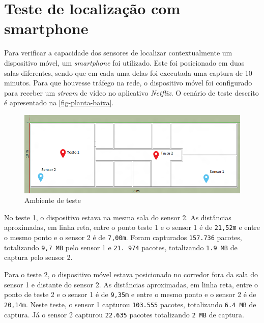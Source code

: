 \section{Teste de localização com smartphone}
\label{sec:teste-smarphone}

Para verificar a capacidade dos sensores de localizar contextualmente um
dispositivo móvel, um \emph{smartphone} foi utilizado. Este foi posicionado em duas salas
diferentes, sendo que em cada uma delas foi executada uma captura de 10 minutos. Para
que houvesse tráfego na rede, o dispositivo móvel foi configurado para receber um
\emph{stream} de vídeo no aplicativo \emph{Netflix}. O cenário de teste descrito é apresentado na \autoref{fig-planta-baixa}.

\begin{figure}[htb]
	\caption{\label{fig-planta-baixa}Ambiente de teste}
	\begin{center}
		\includegraphics[width=1\textwidth]{060-testes/data-analisis/planta-baixa-smartphone.png}
	\end{center}
\end{figure}


No teste 1, o dispositivo estava na mesma sala do sensor 2. As distâncias
aproximadas, em linha reta, entre o ponto teste 1 e o sensor 1 é de \texttt{21,52m} e
entre o mesmo ponto e o sensor 2 é de \texttt{7,00m}. Foram capturados
\texttt{157.736} pacotes, totalizando \texttt{9,7 MB} pelo sensor 1 e \texttt{21.
974} pacotes, totalizando \texttt{1.9 MB} de captura pelo sensor 2.

Para o teste 2, o dispositivo móvel estava posicionado no corredor fora da sala
do sensor 1 e distante do sensor 2. As distâncias aproximadas, em linha reta, entre o
ponto de teste 2 e o sensor 1 é de \texttt{9,35m} e entre o mesmo ponto e o sensor
2 é de \texttt{20,14m}. Neste teste, o sensor 1 capturou \texttt{103.555} pacotes,
totalizando \texttt{6.4 MB} de captura. Já o sensor 2 capturou \texttt{22.635}
pacotes totalizando \texttt{2 MB} de captura.

